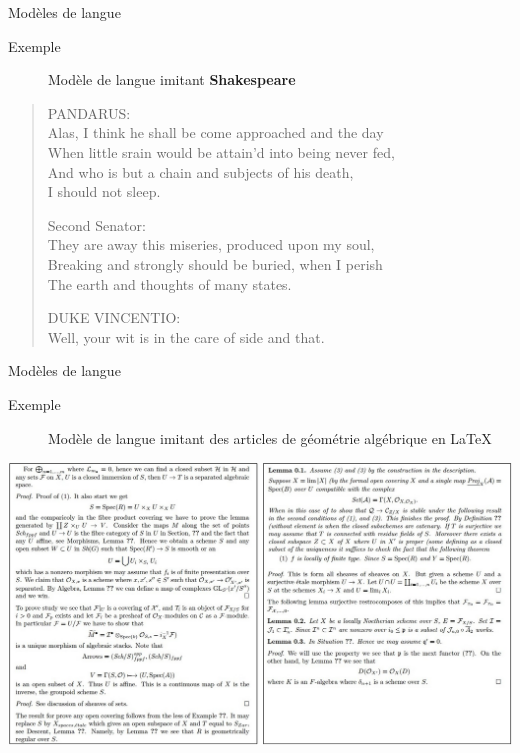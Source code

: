 \documentclass[french]{beamer}
\begin{document}
\begin{frame}{Modèles de langue}

\begin{description}
	\item [Exemple] Modèle de langue imitant \textbf{Shakespeare} \cite{karpathy2015unreasonable}
\end{description}

\begin{quote}
{\small
PANDARUS:\\
Alas, I think he shall be come approached and the day\\
When little srain would be attain'd into being never fed,\\
And who is but a chain and subjects of his death,\\
I should not sleep.\\ \vspace{.5cm}

Second Senator:\\
They are away this miseries, produced upon my soul,\\
Breaking and strongly should be buried, when I perish\\
The earth and thoughts of many states.\\ \vspace{.5cm}

DUKE VINCENTIO:\\
Well, your wit is in the care of side and that. }
\end{quote}

\end{frame}

\begin{frame}{Modèles de langue}
\begin{description}
	\item [Exemple] Modèle de langue imitant des articles de géométrie algébrique en \LaTeX \cite{karpathy2015unreasonable}
\end{description}

\includegraphics[width=\textwidth]{figures/latex_rnn}

\end{frame}
\end{document}
